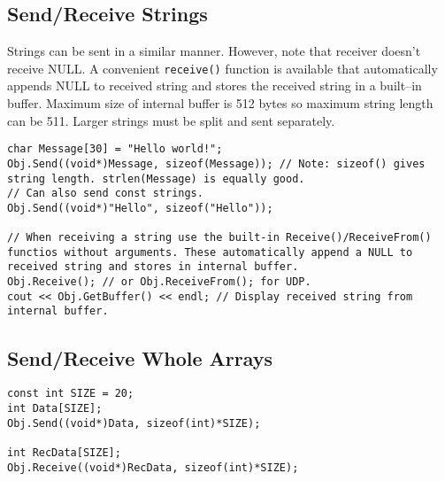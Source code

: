 \documentclass[12pt,a4paper]{article}
\begin{document}
\subsection{Send/Receive Strings}
Strings can be sent in a similar manner. However, note that receiver doesn't receive NULL. A convenient \verb|receive()| function is available that automatically appends NULL to received string and stores the received string in a built--in buffer. Maximum size of internal buffer is 512 bytes so maximum string length can be 511. Larger strings must be split and sent separately.
\begin{lstlisting}
char Message[30] = "Hello world!";
Obj.Send((void*)Message, sizeof(Message)); // Note: sizeof() gives string length. strlen(Message) is equally good.
// Can also send const strings.
Obj.Send((void*)"Hello", sizeof("Hello"));

// When receiving a string use the built-in Receive()/ReceiveFrom() functios without arguments. These automatically append a NULL to received string and stores in internal buffer.
Obj.Receive(); // or Obj.ReceiveFrom(); for UDP.
cout << Obj.GetBuffer() << endl; // Display received string from internal buffer.
\end{lstlisting}
\subsection{Send/Receive Whole Arrays}
\begin{lstlisting}
const int SIZE = 20;
int Data[SIZE];
Obj.Send((void*)Data, sizeof(int)*SIZE);

int RecData[SIZE];
Obj.Receive((void*)RecData, sizeof(int)*SIZE);
\end{lstlisting}
\end{document}
